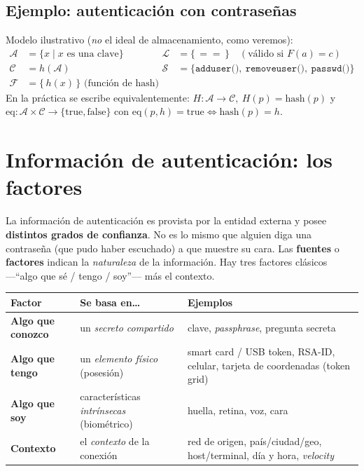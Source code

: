 \documentclass[11pt,a4paper]{article}
\newcommand{\Aset}{\mathcal{A}}
\newcommand{\Cset}{\mathcal{C}}
\newcommand{\Fset}{\mathcal{F}}
\newcommand{\Lset}{\mathcal{L}}
\newcommand{\Sset}{\mathcal{S}}
\begin{document}
\subsection{Ejemplo: autenticación con contraseñas}
Modelo ilustrativo (\emph{no} el ideal de almacenamiento, como veremos):
\[
\begin{aligned}
  \Aset &= \{x \mid x \text{ es una clave}\} & \Lset &= \{\,==\,\}
     \quad(\text{válido si } F(a)=c)\\
  \Cset &= h(\Aset) & \Sset &= \{\texttt{adduser()},\ \texttt{removeuser()},\ \texttt{passwd()}\}\\
  \Fset &= \{\,h(x)\,\} \text{ (función de hash)} &
\end{aligned}
\]
En la práctica se escribe equivalentemente: $H : \Aset\to\Cset,\ H(p)=\mathrm{hash}(p)$ y
$\mathrm{eq}:\Aset\times\Cset\to\{\text{true},\text{false}\}$ con
$\mathrm{eq}(p,h)=\text{true} \iff \mathrm{hash}(p)=h$.

\section{Información de autenticación: los factores}

La información de autenticación es provista por la entidad externa y posee
\textbf{distintos grados de confianza}. No es lo mismo que alguien diga una contraseña
(que pudo haber escuchado) a que muestre su cara. Las \textbf{fuentes} o \textbf{factores}
indican la \emph{naturaleza} de la información. Hay tres factores clásicos —``algo que sé /
tengo / soy''— más el contexto.

\begin{center}
\renewcommand{\arraystretch}{1.35}
\begin{tabular}{>{\bfseries}p{3.0cm} p{6.0cm} p{4.6cm}}
\toprule
Factor & Se basa en\dots & Ejemplos \\
\midrule
Algo que conozco & un \emph{secreto compartido} & clave, \emph{passphrase}, pregunta secreta\\
Algo que tengo & un \emph{elemento físico} (posesión) & smart card / USB token, RSA-ID, celular, tarjeta de coordenadas (token grid)\\
Algo que soy & características \emph{intrínsecas} (biométrico) & huella, retina, voz, cara\\
Contexto & el \emph{contexto} de la conexión & red de origen, país/ciudad/geo, host/terminal, día y hora, \emph{velocity}\\
\bottomrule
\end{tabular}
\end{center}
\end{document}
